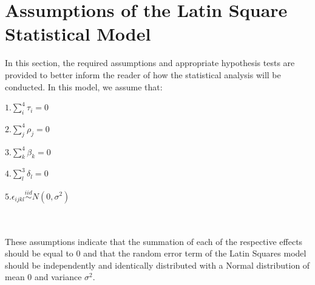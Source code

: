 \section{Assumptions of the Latin Square Statistical Model}
In this section, the required assumptions and appropriate hypothesis tests are provided to better inform the reader of how the statistical analysis will be conducted. In this model, we assume that:\\
\centerline{$1. \sum_{i}^{4} \tau_{i} = 0$}
\centerline{$2. \sum_{j}^{4} \rho_{j} = 0$}
\centerline{$3. \sum_{k}^{4} \beta_{k} = 0$}
\centerline{$4. \sum_{l}^{3} \delta_{l} = 0$}
\centerline{$5. \epsilon_{ijkl} \overset{iid}{\sim} N(0,\sigma^2) $}\\\\
These assumptions indicate that the summation of each of the respective effects should be equal to $0$ and that the random error term of the Latin Squares model should be independently and identically distributed with a Normal distribution of mean $0$ and variance $\sigma^2$.\\\\
